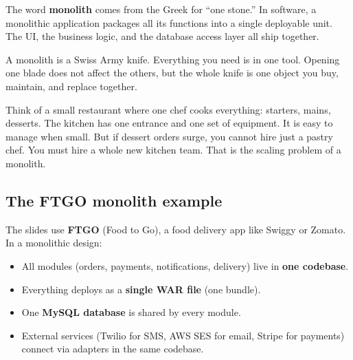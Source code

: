 \documentclass[a4paper,11pt]{article}
\newcommand{\vocab}[1]{\textbf{\color{navy}#1}}
\begin{document}
The word \vocab{monolith} comes from the Greek for ``one stone.''
In software, a monolithic application packages all its functions into a single deployable unit.
The UI, the business logic, and the database access layer all ship together.

\begin{intuition}
A monolith is a Swiss Army knife.
Everything you need is in one tool.
Opening one blade does not affect the others,
but the whole knife is one object you buy, maintain, and replace together.
\end{intuition}

\begin{everyday}
Think of a small restaurant where one chef cooks everything: starters, mains, desserts.
The kitchen has one entrance and one set of equipment.
It is easy to manage when small.
But if dessert orders surge, you cannot hire just a pastry chef.
You must hire a whole new kitchen team.
That is the scaling problem of a monolith.
\end{everyday}

\subsection{The FTGO monolith example}

The slides use \textbf{FTGO} (Food to Go), a food delivery app like Swiggy or Zomato.
In a monolithic design:

\begin{itemize}
  \item All modules (orders, payments, notifications, delivery) live in \textbf{one codebase}.
  \item Everything deploys as a \textbf{single WAR file} (one bundle).
  \item One \textbf{MySQL database} is shared by every module.
  \item External services (Twilio for SMS, AWS SES for email, Stripe for payments)
    connect via adapters in the same codebase.
\end{itemize}
\end{document}
